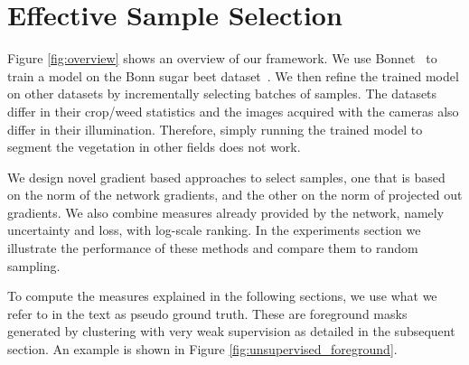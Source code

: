 \documentclass[letterpaper, 10 pt, conference]{ieeeconf}  %
\begin{document}
\section{Effective Sample Selection}\label{sec:approach}

Figure \ref{fig:overview} shows an overview of our framework. We use Bonnet~\cite{milioto2018bonnet} to train a model on the Bonn sugar beet dataset~\cite{chebrolu2017agricultural}. We then refine the trained model on other datasets by incrementally selecting batches of samples. The datasets differ in their crop/weed statistics and the images acquired with the cameras also differ in their illumination. Therefore, simply running the trained model to segment the vegetation in other fields does not work.


We design novel gradient based approaches to select samples, one that is based on the norm of the network gradients, and the other on the norm of projected out gradients. We also combine measures already provided by the network, namely uncertainty and loss, with log-scale ranking. In the experiments section we illustrate the performance of these methods and compare them to random sampling.


   

To compute the measures explained in the following sections, we use what we refer to in the text as pseudo ground truth. These are foreground masks generated by clustering with very weak supervision as detailed in the subsequent section. An example is shown in Figure \ref{fig:unsupervised_foreground}.
\end{document}
